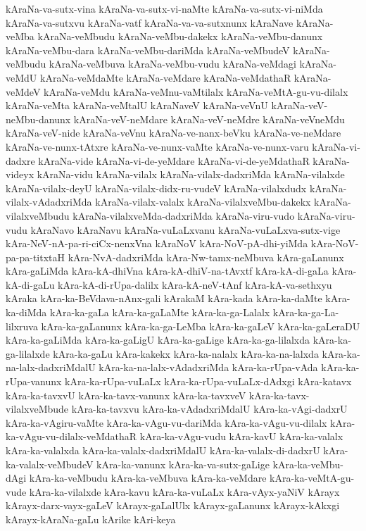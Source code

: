 {kAraNa-va-sutx-vina
kAraNa-va-sutx-vi-naMte
kAraNa-va-sutx-vi-niMda
kAraNa-va-sutxvu
kAraNa-vatf
kAraNa-va-va-sutxnunx
kAraNave
kAraNa-veMba
kAraNa-veMbudu
kAraNa-veMbu-dakekx
kAraNa-veMbu-danunx
kAraNa-veMbu-dara
kAraNa-veMbu-dariMda
kAraNa-veMbudeV
kAraNa-veMbudu
kAraNa-veMbuva
kAraNa-veMbu-vudu
kAraNa-veMdagi
kAraNa-veMdU
kAraNa-veMdaMte
kAraNa-veMdare
kAraNa-veMdathaR
kAraNa-veMdeV
kAraNa-veMdu
kAraNa-veMnu-vaMtilalx
kAraNa-veMtA-gu-vu-dilalx
kAraNa-veMta
kAraNa-veMtalU
kAraNaveV
kAraNa-veVnU
kAraNa-veV-neMbu-danunx
kAraNa-veV-neMdare
kAraNa-veV-neMdre
kAraNa-veVneMdu
kAraNa-veV-nide
kAraNa-veVnu
kAraNa-ve-nanx-beVku
kAraNa-ve-neMdare
kAraNa-ve-nunx-tAtxre
kAraNa-ve-nunx-vaMte
kAraNa-ve-nunx-varu
kAraNa-vi-dadxre
kAraNa-vide
kAraNa-vi-de-yeMdare
kAraNa-vi-de-yeMdathaR
kAraNa-videyx
kAraNa-vidu
kAraNa-vilalx
kAraNa-vilalx-dadxriMda
kAraNa-vilalxde
kAraNa-vilalx-deyU
kAraNa-vilalx-didx-ru-vudeV
kAraNa-vilalxdudx
kAraNa-vilalx-vAdadxriMda
kAraNa-vilalx-valalx
kAraNa-vilalxveMbu-dakekx
kAraNa-vilalxveMbudu
kAraNa-vilalxveMda-dadxriMda
kAraNa-viru-vudo
kAraNa-viru-vudu
kAraNavo
kAraNavu
kAraNa-vuLaLxvanu
kAraNa-vuLaLxva-sutx-vige
kAra-NeV-nA-pa-ri-ciCx-nenxVna
kAraNoV
kAra-NoV-pA-dhi-yiMda
kAra-NoV-pa-pa-titxtaH
kAra-NvA-dadxriMda
kAra-Nw-tamx-neMbuva
kAra-gaLanunx
kAra-gaLiMda
kAra-kA-dhiVna
kAra-kA-dhiV-na-tAvxtf
kAra-kA-di-gaLa
kAra-kA-di-gaLu
kAra-kA-di-rUpa-dalilx
kAra-kA-neV-tAnf
kAra-kA-va-sethxyu
kAraka
kAra-ka-BeVdava-nAnx-gali
kArakaM
kAra-kada
kAra-ka-daMte
kAra-ka-diMda
kAra-ka-gaLa
kAra-ka-gaLaMte
kAra-ka-ga-Lalalx
kAra-ka-ga-La-lilxruva
kAra-ka-gaLanunx
kAra-ka-ga-LeMba
kAra-ka-gaLeV
kAra-ka-gaLeraDU
kAra-ka-gaLiMda
kAra-ka-gaLigU
kAra-ka-gaLige
kAra-ka-ga-lilalxda
kAra-ka-ga-lilalxde
kAra-ka-gaLu
kAra-kakekx
kAra-ka-nalalx
kAra-ka-na-lalxda
kAra-ka-na-lalx-dadxriMdalU
kAra-ka-na-lalx-vAdadxriMda
kAra-ka-rUpa-vAda
kAra-ka-rUpa-vanunx
kAra-ka-rUpa-vuLaLx
kAra-ka-rUpa-vuLaLx-dAdxgi
kAra-katavx
kAra-ka-tavxvU
kAra-ka-tavx-vanunx
kAra-ka-tavxveV
kAra-ka-tavx-vilalxveMbude
kAra-ka-tavxvu
kAra-ka-vAdadxriMdalU
kAra-ka-vAgi-dadxrU
kAra-ka-vAgiru-vaMte
kAra-ka-vAgu-vu-dariMda
kAra-ka-vAgu-vu-dilalx
kAra-ka-vAgu-vu-dilalx-veMdathaR
kAra-ka-vAgu-vudu
kAra-kavU
kAra-ka-valalx
kAra-ka-valalxda
kAra-ka-valalx-dadxriMdalU
kAra-ka-valalx-di-dadxrU
kAra-ka-valalx-veMbudeV
kAra-ka-vanunx
kAra-ka-va-sutx-gaLige
kAra-ka-veMbu-dAgi
kAra-ka-veMbudu
kAra-ka-veMbuva
kAra-ka-veMdare
kAra-ka-veMtA-gu-vude
kAra-ka-vilalxde
kAra-kavu
kAra-ka-vuLaLx
kAra-vAyx-yaNiV
kArayx
kArayx-darx-vayx-gaLeV
kArayx-gaLalUlx
kArayx-gaLanunx
kArayx-kAkxgi
kArayx-kAraNa-gaLu
kArike
kAri-keya
}
